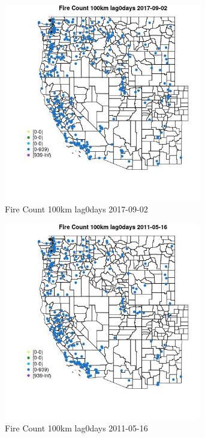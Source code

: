 \begin{figure} 
\centering  
\includegraphics[width=0.77\textwidth]{Code_Outputs/Report_ML_input_PM25_Step4_part_e_de_duplicated_aves_compiled_2019-05-20wNAs_MapObsFire_Count_100km_lag0days2017-09-02.jpg} 
\caption{\label{fig:Report_ML_input_PM25_Step4_part_e_de_duplicated_aves_compiled_2019-05-20wNAsMapObsFire_Count_100km_lag0days2017-09-02}Fire Count 100km lag0days 2017-09-02} 
\end{figure} 
 

\begin{figure} 
\centering  
\includegraphics[width=0.77\textwidth]{Code_Outputs/Report_ML_input_PM25_Step4_part_e_de_duplicated_aves_compiled_2019-05-20wNAs_MapObsFire_Count_100km_lag0days2011-05-16.jpg} 
\caption{\label{fig:Report_ML_input_PM25_Step4_part_e_de_duplicated_aves_compiled_2019-05-20wNAsMapObsFire_Count_100km_lag0days2011-05-16}Fire Count 100km lag0days 2011-05-16} 
\end{figure} 
 

